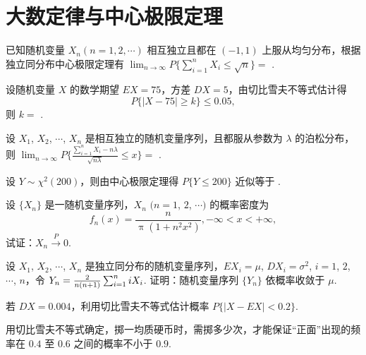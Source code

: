 \section{大数定律与中心极限定理}
	\begin{titwo}
		已知随机变量 $X_{n}(n = 1,2,\cdots)$ 相互独立且都在 $(-1,1)$ 上服从均匀分布，根据独立同分布中心极限定理有 $\lim_{n \to \infty} P \biggl\{ \sum_{i=1}^{n} X_{i} \leq \sqrt{n} \biggr\} = $ \kuo.

	\end{titwo}

	\begin{titwo}
		设随机变量 $X$ 的数学期望 $EX = 75$，方差 $DX = 5$，由切比雪夫不等式估计得
		\[
			P\{ |X - 75| \geq k \} \leq 0.05,
		\]
		则 $k = $ \htwo.
	\end{titwo}

	\begin{titwo}
		设 $X_{1}$, $X_{2}$, $\cdots$, $X_{n}$ 是相互独立的随机变量序列，且都服从参数为 $\lambda$ 的泊松分布，则 $\lim_{n \to \infty} P \Biggl\{ \frac{ \sum_{i=1}^{n} X_{i} - n \lambda }{\sqrt{n \lambda}} \leq x \Biggr\} = $ \htwo.
	\end{titwo}

	\begin{titwo}
		设 $Y \sim \chi^{2}(200)$，则由中心极限定理得 $P\{ Y \leq 200 \}$ 近似等于 \htwo.
	\end{titwo}

	\begin{titwo}
		设 $\{ X_{n} \}$ 是一随机变量序列，$X_{n}$ $(n = 1$, $2$, $\cdots)$ 的概率密度为
		\[
			f_{n}(x) = \frac{n}{\uppi( 1 + n^{2} x^{2} )}, -\infty < x < +\infty,
		\]
		试证：$X_{n}  \xrightarrow{P} 0$.
	\end{titwo}

	\begin{titwo}
		设 $X_{1}$, $X_{2}$, $\cdots$, $X_{n}$ 是独立同分布的随机变量序列，$EX_{i} = \mu$, $DX_{i} = \sigma^{2}$, $i = 1$, $2$, $\cdots$, $n$，令 $Y_{n} = \frac{2}{n(n + 1)} \* \sum_{i=1}^{n} iX_{i}$. 证明：随机变量序列 $\{Y_{n}\}$ 依概率收敛于 $\mu$.
	\end{titwo}

	\begin{titwo}
		若 $DX = 0.004$，利用切比雪夫不等式估计概率 $P\{ |X - EX| < 0.2 \}$.
	\end{titwo}

	\begin{titwo}
		用切比雪夫不等式确定，掷一均质硬币时，需掷多少次，才能保证“正面”出现的频率在 $0.4$ 至 $0.6$ 之间的概率不小于 $0.9$.
	\end{titwo}

